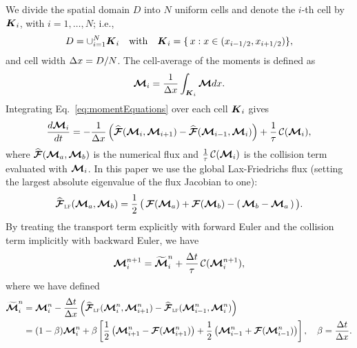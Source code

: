 We divide the spatial domain $D$ into $N$ uniform cells and denote the $i$-th cell by $\boldsymbol{K}_{i}$, with $i = 1,\ldots,N$; i.e.,
\begin{equation*}
  D = \cup_{i = 1}^{N} \boldsymbol{K}_{i} \quad \text{with} \quad
  \boldsymbol{K}_{i}=\{\,x : x\in(x_{i-1/2}, x_{i+1/2})\},
\end{equation*}
and cell width $\Delta x = D/N$.  
The cell-average of the moments is defined as
\begin{equation}
  \boldsymbol{\mathcal{M}}_{i} = \dfrac{1}{\Delta x} \int_{\boldsymbol{K}_i}\boldsymbol{\mathcal{M}} dx.
\end{equation}
Integrating Eq.~\eqref{eq:momentEquations} over each cell $\boldsymbol{K}_{i}$ gives
\begin{equation}
  \dfrac{d \bcM_{i}}{d t} = - \dfrac{1}{\dx} \left( \widehat{\bcF}(\bcM_{i},\bcM_{i+1}) -  \widehat{\bcF}(\bcM_{i-1},\bcM_{i})\right) + \f{1}{\tau}\,\cC(\bcM_{i}),
  \label{eq:SemiDiscretizatedMomentEquation}
\end{equation}
where $\widehat{\boldsymbol{\mathcal{F}}}(\boldsymbol{\mathcal{M}}_{a},\boldsymbol{\mathcal{M}}_{b})$ is the numerical flux and $\frac{1}{\tau}\,\mathcal{C}(\boldsymbol{\mathcal{M}}_{i})$ is the collision term evaluated with $\boldsymbol{\mathcal{M}}_{i}$.
In this paper we use the global Lax-Friedrichs flux (setting the largest absolute eigenvalue of the flux Jacobian to one):
\begin{equation}
  \widehat{\bcF}_{\LF}(\vect{\cM}_{a},\vect{\cM}_{b})
  =\f{1}{2}\,\big(\,\bcF(\vect{\cM}_{a})+\bcF(\vect{\cM}_{b})-(\,\vect{\cM}_{b}-\vect{\cM}_{a}\,)\,\big).
  \label{eq:Lax-Friedrichs flux}
\end{equation}
By treating the transport term explicitly with forward Euler and the collision term implicitly with backward Euler, we have
\begin{align}
  \bcM_{i}^{n+1} = \widetilde{\bcM}^{n}_{i} + \f{\dt}{\tau}\,\cC(\bcM^{n+1}_{i}),
  \label{eq:MomentIMEX}
\end{align}
where we have defined
\begin{align}
  \widetilde{\bcM}^{n}_{i} 
  & = \bcM_{i}^{n} - \frac{\dt}{\dx} \left( \widehat{\bcF}_{\LF}(\bcM^{n}_{i},\bcM^{n}_{i+1}) -  \widehat{\bcF}_{\LF}(\bcM^{n}_{i-1},\bcM^{n}_{i})\right)\nonumber \\
  & = (1-\beta)\bcM_{i}^{n} + \beta\left[ \f{1}{2}\left( \bcM^{n}_{i+1}-\bcF(\bcM^{n}_{i+1})\right)  + \f{1}{2}\left( \bcM^{n}_{i-1}+\bcF(\bcM^{n}_{i-1})\right)\right],
  \quad\beta = \frac{\dt}{\dx}.  
\label{eq:widetildeM}
\end{align}

